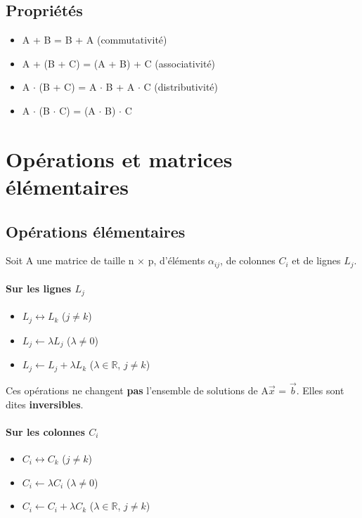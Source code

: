 \documentclass[10pt,a4paper]{book}
\newcommand{\R}{\mathbb{R}}
\newcommand{\x}{$\times$ }
\begin{document}
\subsection{Propriétés}

\begin{itemize}
\item A + B = B + A (commutativité)
\item A + (B + C) = (A + B) + C (associativité)
\item A $\cdot$ (B + C) = A $\cdot$ B + A $\cdot$ C (distributivité)
\item A $\cdot$ (B $\cdot$ C) = (A $\cdot$ B) $\cdot$ C
\end{itemize}

\section{Opérations et matrices élémentaires}

\subsection{Opérations élémentaires}

Soit A une matrice de taille n \x p, d'éléments $\alpha_{ij}$, de colonnes $C_i$ et de lignes $L_j$.
\paragraph{Sur les lignes $L_j$}
\begin{itemize}
\item $L_j \leftrightarrow L_k$ ($j \neq k$)
\item $L_j \leftarrow \lambda L_j$ ($\lambda \neq 0$)
\item $L_j \leftarrow L_j + \lambda L_k$ ($\lambda \in \R$, $j \neq k$)
\end{itemize}
Ces opérations ne changent \textbf{pas} l'ensemble de solutions de A$\vec{x}$ = $\vec{b}$. Elles sont dites \textbf{inversibles}.

\paragraph{Sur les colonnes $C_i$}
\begin{itemize}
\item $C_i \leftrightarrow C_k$ ($j \neq k$)
\item $C_i \leftarrow \lambda C_i$ ($\lambda \neq 0$)
\item $C_i \leftarrow C_i + \lambda C_k$ ($\lambda \in \R$, $j \neq k$)
\end{itemize}
\end{document}
